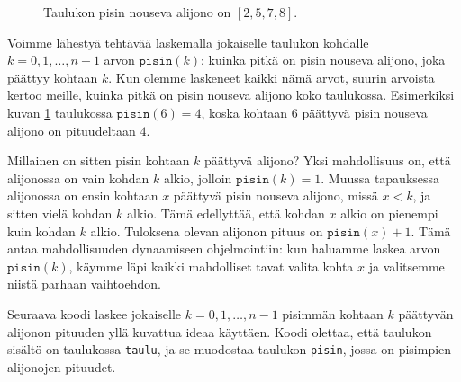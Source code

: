\begin{figure}
\center
{}
\caption{Taulukon pisin nouseva alijono on $[2,5,7,8]$.}
\label{fig:pisnou}
\end{figure}

Voimme lähestyä tehtävää laskemalla jokaiselle taulukon
kohdalle $k=0,1,\dots,n-1$ arvon $\texttt{pisin}(k)$:
kuinka pitkä on pisin nouseva alijono, joka päättyy kohtaan $k$.
Kun olemme laskeneet kaikki nämä arvot, suurin arvoista kertoo meille,
kuinka pitkä on pisin nouseva alijono koko taulukossa.
Esimerkiksi kuvan \ref{fig:pisnou} taulukossa $\texttt{pisin}(6)=4$,
koska kohtaan $6$ päättyvä pisin nouseva alijono on pituudeltaan $4$.

Millainen on sitten pisin kohtaan $k$ päättyvä alijono?
Yksi mahdollisuus on, että alijonossa on vain kohdan $k$ alkio,
jolloin $\texttt{pisin}(k)=1$.
Muussa tapauksessa alijonossa on ensin kohtaan $x$ päättyvä
pisin nouseva alijono, missä $x<k$, ja sitten vielä kohdan $k$ alkio.
Tämä edellyttää, että kohdan $x$ alkio on pienempi
kuin kohdan $k$ alkio.
Tuloksena olevan alijonon pituus on $\texttt{pisin}(x)+1$.
Tämä antaa mahdollisuuden dynaamiseen ohjelmointiin:
kun haluamme laskea arvon $\texttt{pisin}(k)$,
käymme läpi kaikki mahdolliset tavat valita kohta $x$
ja valitsemme niistä parhaan vaihtoehdon.

Seuraava koodi laskee jokaiselle $k=0,1,\dots,n-1$
pisimmän kohtaan $k$ päättyvän alijonon pituuden yllä kuvattua
ideaa käyttäen.
Koodi olettaa, että taulukon sisältö on taulukossa \texttt{taulu},
ja se muodostaa taulukon \texttt{pisin}, jossa on pisimpien
alijonojen pituudet.

